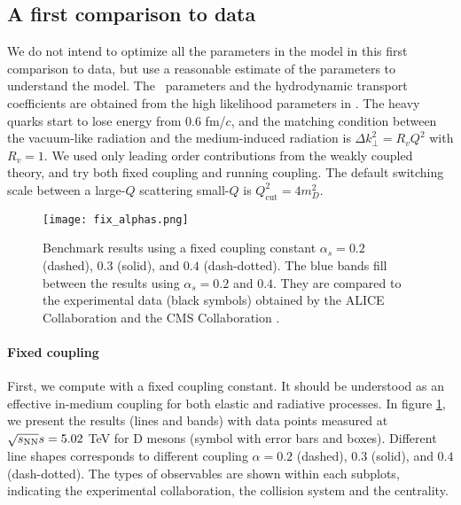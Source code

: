 \subsection{A first comparison to data}
We do not intend to optimize all the parameters in the model in this first comparison to data, but use a reasonable estimate of the parameters to understand the model.
The \trento\ parameters and the hydrodynamic transport coefficients are obtained from the high likelihood parameters in \cite{Bernhard:2018hnz}.
The heavy quarks start to lose energy from $0.6$ fm/$c$, and the matching condition between the vacuum-like radiation and the medium-induced radiation is $\Delta k_\perp^2 = R_v Q^2$ with $R_v = 1$.
We used only leading order contributions from the weakly coupled theory, and try both fixed coupling and running coupling.
The default switching scale between a large-$Q$ scattering small-$Q$ is $Q_{\textrm{cut}}^2 = 4 m_D^2$.

\begin{figure}
\singlespacing
\centering
\texttt{[image: fix\_alphas.png]}
\caption[Benchmark results using a fixed coupling constant $\alpha_s = 0.2$ (dashed),]{Benchmark results using a fixed coupling constant $\alpha_s = 0.2$ (dashed), $0.3$ (solid), and $0.4$ (dash-dotted). The blue bands fill between the results using $\alpha_s=0.2$ and $0.4$. They are compared to the experimental data (black symbols) obtained by the ALICE Collaboration \cite{Acharya:2017qps,Acharya:2018hre} and the CMS Collaboration \cite{Sirunyan:2017xss,Sirunyan:2017plt}.}
\label{fig:new:fix-a}
\end{figure}

\paragraph{Fixed coupling} First, we compute with a fixed coupling constant.
It should be understood as an effective in-medium coupling for both elastic and radiative processes.
In figure \ref{fig:new:fix-a}, we present the results (lines and bands) with data points measured at $\sqrt{s_\mathrm{NN}}{s} = 5.02$ TeV for D mesons (symbol with error bars and boxes).
Different line shapes corresponds to different coupling $\alpha=0.2$ (dashed), $0.3$ (solid), and $0.4$ (dash-dotted). 
The types of observables are shown within each subplots, indicating the experimental collaboration, the collision system and the centrality.

